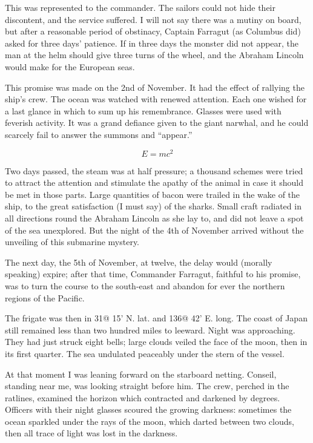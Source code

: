 This was represented to the commander.  The sailors could
not hide their discontent, and the service suffered.
I will not say there was a mutiny on board, but after a reasonable
period of obstinacy, Captain Farragut (as Columbus did)
asked for three days' patience.  If in three days the monster did
not appear, the man at the helm should give three turns of the wheel,
and the Abraham Lincoln would make for the European seas.

This promise was made on the 2nd of November.  It had the effect of
rallying the ship's crew.  The ocean was watched with renewed attention.
Each one wished for a last glance in which to sum up his remembrance.
Glasses were used with feverish activity.  It was a grand defiance
given to the giant narwhal, and he could scarcely fail to answer
the summons and ``appear.''

\begin{equation}
E=mc^2
\end{equation}

Two days passed, the steam was at half pressure; a thousand
schemes were tried to attract the attention and stimulate
the apathy of the animal in case it should be met in those parts.
Large quantities of bacon were trailed in the wake of the ship,
to the great satisfaction (I must say) of the sharks.
Small craft radiated in all directions round the Abraham Lincoln
as she lay to, and did not leave a spot of the sea unexplored.
But the night of the 4th of November arrived without the unveiling of
this submarine mystery.

The next day, the 5th of November, at twelve, the delay would
(morally speaking) expire; after that time, Commander Farragut,
faithful to his promise, was to turn the course to the south-east
and abandon for ever the northern regions of the Pacific.

The frigate was then in 31@ 15' N. lat.  and 136@ 42' E. long.
The coast of Japan still remained less than two hundred miles to leeward.
Night was approaching.  They had just struck eight bells;
large clouds veiled the face of the moon, then in its first quarter.
The sea undulated peaceably under the stern of the vessel.

At that moment I was leaning forward on the starboard netting.
Conseil, standing near me, was looking straight before him.
The crew, perched in the ratlines, examined the horizon which
contracted and darkened by degrees.  Officers with their night
glasses scoured the growing darkness:  sometimes the ocean sparkled
under the rays of the moon, which darted between two clouds,
then all trace of light was lost in the darkness.

